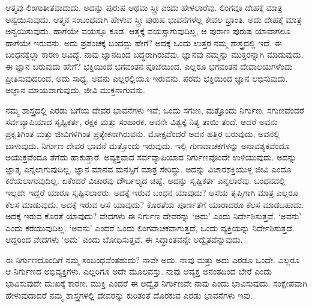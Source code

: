 ಆತ್ಮವು ಲಿಂಗಾತೀತವಾದುದು. ಅದನ್ನು ಪುರುಷ ಅಥವಾ ಸ್ತ್ರೀ ಎಂದು ಹೇಳಲಾರೆವು. ಲಿಂಗವೂ ದೇಹಕ್ಕೆ ಮಾತ್ರ ಅನ್ವಯಿಸುವುದು. ಆತ್ಮನ ಸಂಬಂಧವಾಗಿ ಹೇಳುವ ಸ್ತ್ರೀ ಪುರುಷ ಭಾವನೆಗಳೆಲ್ಲ ಕೇವಲ ಭ್ರಾಂತಿ. ಅದು ದೇಹಕ್ಕೆ ಮಾತ್ರ ಅನ್ವಯಿಸುವುದು. ಹಾಗೆಯೇ ವಯಸ್ಸೂ ಕೂಡ. ಆತ್ಮಕ್ಕೆ ವಯಸ್ಸಾಗುವುದಿಲ್ಲ, ಆ ಪುರಾಣ ಪುರುಷ ಯಾವಾಗಲೂ ಹಾಗೆಯೇ ಇರುವನು. ಅದು ಪ್ರಪಂಚಕ್ಕೆ ಬಂದದ್ದು ಹೇಗೆ? ಅದಕ್ಕೆ ಒಂದು ಉತ್ತರ ನಮ್ಮ ಶಾಸ್ತ್ರದಲ್ಲಿ ಇದೆ. ಈ ಬಂಧನಕ್ಕೆಲ್ಲಾ ಕಾರಣ ಅವಿದ್ಯೆ. ನಾವು ಜ್ಞಾನದಿಂದ ಬದ್ಧರಾಗಿರುವೆವು. ಜ್ಞಾನವು ನಮ್ಮನ್ನು ಮುಕ್ತರನ್ನಾಗಿ ಮಾಡುವುದು. ಈ ಜ್ಞಾನ ಬರುವುದು ಹೇಗೆ? ಭಕ್ತಿಯಿಂದ ಭಗವಂತನ ಪೂಜೆಯಿಂದ, ಎಲ್ಲರೂ ಭಗವಂತನ ದೇವಾಲಯಗಳೆಂದು ಪ್ರೀತಿಸುವುದರಿಂದ, ಅದು ಸಾಧ್ಯ. ಅವನು ಎಲ್ಲರಲ್ಲಿಯೂ ಇರುವನು. ಪರಮ ಭಕ್ತಿಯಿಂದ ಜ್ಞಾನ ಲಭಿಸುವುದು. ಅಜ್ಞಾನ ಮಾಯವಾಗುವುದು, ಜೀವಿ ಮುಕ್ತನಾಗುವನು.

ನಮ್ಮ ಶಾಸ್ತ್ರದಲ್ಲಿ ಎರಡು ಬಗೆಯ ದೇವರ ಭಾವನೆಗಳು ಇವೆ; ಒಂದು ಸಗುಣ, ಮತ್ತೊಂದು ನಿರ್ಗುಣ. ಸಗುಣವೆಂದರೆ ಸರ್ವವ್ಯಾಪಿಯಾದ ಸೃಷ್ಟಿಕರ್ತ, ರಕ್ಷಕ ಮತ್ತು ಸಂಹಾರಕ. ಅವನೇ ವಿಶ್ವಕ್ಕೆ ನಿತ್ಯ ತಾಯಿ ತಂದೆ. ಆದರೆ ಅವನು ಪ್ರಕೃತಿಗಿಂತ ಮತ್ತು ಜೀವಿಗಳಿಗಿಂತ ಪ್ರತ್ಯೇಕನಾಗಿರುವನು. ಮೋಕ್ಷವೆಂದರೆ ಅವನ ಹತ್ತಿರ ಬರುವುದು, ಅವನಲ್ಲಿ ಬಾಳುವುದು. ನಿರ್ಗುಣ ದೇವರ ಭಾವನೆ ಮತ್ತೊಂದು ಇರುವುದು. ಇಲ್ಲಿ ಗುಣವಾಚಕಗಳನ್ನು ಅನಾವಶ್ಯಕವೆಂದೂ ಅಯುಕ್ತವೆಂದೂ ತೆಗೆದು ಹಾಕುತ್ತಾರೆ. ಅವ್ಯಕ್ತವಾದ ಸರ್ವವ್ಯಾಪಿಯಾದ ನಿರ್ಗುಣವೊಂದೇ ಉಳಿಯುವುದು. ಅದನ್ನು ಜ್ಞಾತೃ ಎನ್ನಲಾಗುವುದಿಲ್ಲ. ಜ್ಞಾನ ಮಾನವ ಮನಸ್ಸಿಗೆ ಮಾತ್ರ ಸೇರಿದ್ದು. ಅದನ್ನು ವಿಚಾರಶಕ್ತಿಯುಳ್ಳ ಜೀವಿ ಎಂದೂ ಕರೆಯಲಾಗುವುದಿಲ್ಲ. ಏಕೆಂದರೆ ವಿಚಾರವು ದೌರ್ಬಲ್ಯದ ಚಿಹ್ನೆ. ಅದನ್ನು ಸೃಷ್ಟಿಕರ್ತ ಎನ್ನಲಾರೆವು. ಬಂಧನದಲ್ಲಿ ಇಲ್ಲದೇ ಇದ್ದರೆ ಯಾರೂ ಸೃಷ್ಟಿಸಲಾರರು. ಅದಕ್ಕೆ ಇರುವ ಬಂಧನ ಯಾವುದು? ಆಸೆಯ ತೃಪ್ತಿಗಾಗಿ ಮಾತ್ರ ಎಲ್ಲರೂ ಕೆಲಸ ಮಾಡುವುದು. ಅದಕ್ಕೆ ಇರುವ ಆಸೆ ಯಾವುದು? ಕೊರತೆಯ ಪೂರ್ಣತೆಗೆ ಯಾರಾದರೂ ಕೆಲಸ ಮಾಡಬಹುದು. ಅದಕ್ಕೆ ಇರುವ ಕೊರತೆ ಯಾವುದು? ವೇದಗಳು ಈ ನಿರ್ಗುಣ ದೇವರನ್ನು ‘ಅದು’ ಎಂದು ನಿರ್ದೇಶಿಸುತ್ತವೆ. ‘ಅವನು’ ಎಂದು ಕರೆಯುವುದಿಲ್ಲ. ‘ಅವನು’ ಎಂದರೆ ಒಂದು ಲಿಂಗವಾಚಕವಾಗುತ್ತದೆ, ಒಂದು ವ್ಯಕ್ತಿಯನ್ನು ನಿರ್ದೇಶಿಸುತ್ತದೆ. ಆದ್ದರಿಂದ ವೇದಗಳು ‘ಅದು’ ಎಂದು ಬೋಧಿಸುತ್ತವೆ. ಈ ಸಿದ್ಧಾಂತವನ್ನೇ ಅದ್ವೈತವೆನ್ನುವುದು.

ಈ ನಿರ್ಗುಣದೊಂದಿಗೆ ನಮ್ಮ ಸಂಬಂಧವೆಂತಹುದು? ನಾವೇ ಅದು. ನಾವು ಮತ್ತು ಅದು ಎರಡೂ ಒಂದೇ. ಎಲ್ಲರೂ ಆ ನಿರ್ಗುಣದ ಅಭಿವ್ಯಕ್ತಿಗಳು. ಎಲ್ಲರಿಗೂ ಅದೇ ಮೂಲವಸ್ತು. ನಾವು ಅವ್ಯಕ್ತ ಅನಂತದಿಂದ ಬೇರೆ ಎಂದು ಭಾವಿಸುವುದೇ ದುಃಖಕ್ಕೆ ಕಾರಣ. ಮುಕ್ತಿ ಎಂದರೆ ಈ ಅದ್ವೈತ ನಿರ್ಗುಣವೇ ನಾವು ಎಂದು ಭಾವಿಸುವುದು. ಸಂಕ್ಷೇಪವಾಗಿ ಹೇಳುವುದಾದರೆ ನಮ್ಮ ಶಾಸ್ತ್ರಗಳಲ್ಲಿ ದೇವರನ್ನು ಕುರಿತಂತೆ ದೊರಕುವ ಎರಡು ಭಾವನೆಗಳು ಇವು.

